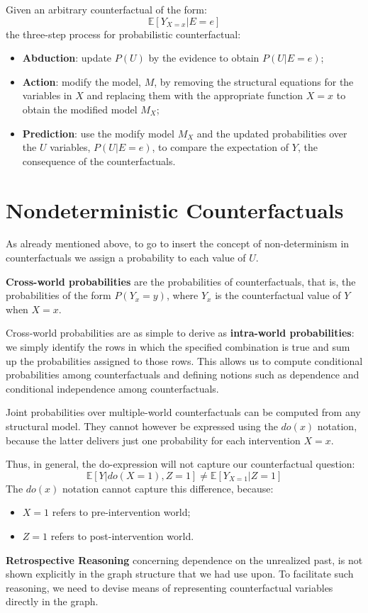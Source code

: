 Given an arbitrary counterfactual of the form:
\begin{equation*}
    \mathbb{E}[Y_{X = x} | E = e]
\end{equation*}
the three-step process for probabilistic counterfactual:
\begin{itemize}
    \item \textbf{Abduction}: update $P(U)$ by the evidence to obtain $P(U| E = e)$;
    \item \textbf{Action}: modify the model, $M$, by removing the structural equations for
          the variables in $X$ and replacing them with the appropriate function
          $X = x$ to obtain the modified model $M_X$;
    \item \textbf{Prediction}: use the modify model $M_X$ and the updated probabilities
          over the $U$ variables, $P(U| E = e)$, to compare the expectation of $Y$,
          the consequence of the counterfactuals.
\end{itemize}
\section{Nondeterministic Counterfactuals}
As already mentioned above, to go to insert the concept of non-determinism in
counterfactuals we assign a probability to each value of $U$.

\textbf{Cross-world probabilities} are the probabilities of counterfactuals, that
is, the probabilities of the form $P(Y_x = y)$, where $Y_x$ is the counterfactual
value of $Y$ when $X = x$.

Cross-world probabilities are as simple to derive as \textbf{intra-world probabilities}:
we simply identify the rows in which the specified combination is true and sum
up the probabilities assigned to those rows. This allows us to compute conditional
probabilities among counterfactuals and defining notions such as dependence and
conditional independence among counterfactuals.

Joint probabilities over multiple-world counterfactuals can be computed from any
structural model. They cannot however be expressed using the $do(x)$ notation,
because the latter delivers just one probability for each intervention $X = x$.

Thus, in general, the do-expression will not capture our counterfactual question:
\begin{equation*}
    \mathbb{E}[Y| do(X = 1), Z = 1] \neq \mathbb{E}[Y_{X = 1} | Z = 1]
\end{equation*}
The $do(x)$ notation cannot capture this difference, because:
\begin{itemize}
    \item $X = 1$ refers to pre-intervention world;
    \item $Z = 1$ refers to post-intervention world.
\end{itemize}

\textbf{Retrospective Reasoning} concerning dependence on the unrealized past, is
not shown explicitly in the graph structure that we had use upon. To facilitate
such reasoning, we need to devise means of representing counterfactual variables
directly in the graph.